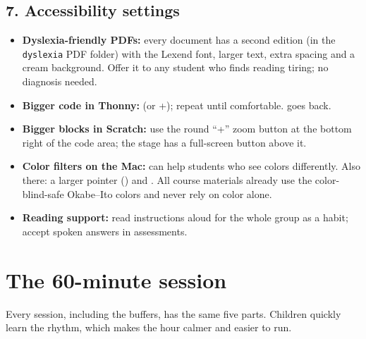 \documentclass[level=1,teacher]{kidscode}
\begin{document}
\subsection{7. Accessibility settings}
\begin{itemize}[itemsep=3pt]
  \item \textbf{Dyslexia-friendly PDFs:} every document has a second edition (in the \texttt{dyslexia}
        PDF folder) with the Lexend font, larger text, extra spacing and a cream background. Offer it to any
        student who finds reading tiring; no diagnosis needed.
  \item \textbf{Bigger code in Thonny:}  (or +\keys{+}); repeat
        until comfortable.  goes back.
  \item \textbf{Bigger blocks in Scratch:} use the round \enquote{+} zoom button at the bottom right of the
        code area; the stage has a full-screen button above it.
  \item \textbf{Color filters on the Mac:} 
        can help students who see colors differently. Also there: a larger pointer
        () and . All course materials already use the color-blind-safe
        Okabe--Ito colors and never rely on color alone.
  \item \textbf{Reading support:} read instructions aloud for the whole group as a habit; accept spoken
        answers in assessments.
\end{itemize}

\section{The 60-minute session}
Every session, including the buffers, has the same five parts. Children quickly learn the rhythm, which
makes the hour calmer and easier to run.

\begin{timeplan}
\end{timeplan}
\end{document}
